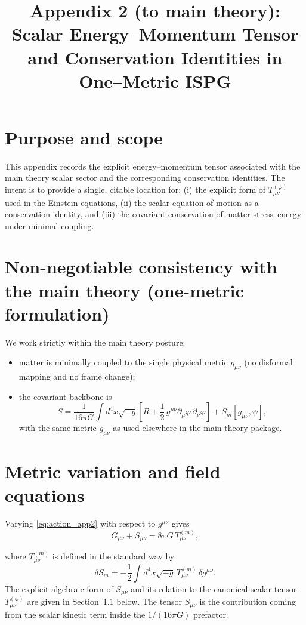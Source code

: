 \documentclass[11pt]{article}
\title{Appendix 2 (to main theory): Scalar Energy--Momentum Tensor and Conservation Identities in One--Metric ISPG}
\author{}
\date{}
\begin{document}
\let\phi\varphi
\maketitle

\section*{Purpose and scope}
This appendix records the explicit energy--momentum tensor associated with the main theory scalar sector and the corresponding conservation identities. The intent is to provide a single, citable location for:
(i) the explicit form of $T^{(\phi)}_{\mu\nu}$ used in the Einstein equations,
(ii) the scalar equation of motion as a conservation identity,
and (iii) the covariant conservation of matter stress--energy under minimal coupling.

\section*{Non-negotiable consistency with the main theory (one-metric formulation)}
We work strictly within the main theory posture:
\begin{itemize}
\item matter is minimally coupled to the single physical metric $g_{\mu\nu}$ (no disformal mapping and no frame change);
\item the covariant backbone is
\begin{equation}
S=\frac{1}{16\pi G}\int d^4x\sqrt{-g}\left[R+\frac12\,g^{\mu\nu}\partial_\mu\phi\,\partial_\nu\phi\right]+S_m[g_{\mu\nu},\psi],
\label{eq:action_app2}
\end{equation}
with the same metric $g_{\mu\nu}$ as used elsewhere in the main theory package.
\end{itemize}

\section{Metric variation and field equations}\label{sec:metricvar}
Varying \eqref{eq:action_app2} with respect to $g^{\mu\nu}$ gives
\begin{equation}
G_{\mu\nu} + S_{\mu\nu} = 8\pi G\,T^{(m)}_{\mu\nu},
\label{eq:einsteinS_app2}
\end{equation}

where $T^{(m)}_{\mu\nu}$ is defined in the standard way by
\begin{equation}
\delta S_m = -\frac12\int d^4x\sqrt{-g}\,T^{(m)}_{\mu\nu}\,\delta g^{\mu\nu}.
\label{eq:Tmdef_app2}
\end{equation}
The explicit algebraic form of $S_{\mu\nu}$ and its relation to the canonical scalar tensor $T^{(\phi)}_{\mu\nu}$ are given in Section~1.1 below.
The tensor $S_{\mu\nu}$ is the contribution coming from the scalar kinetic term inside the $1/(16\pi G)$ prefactor.
\end{document}
